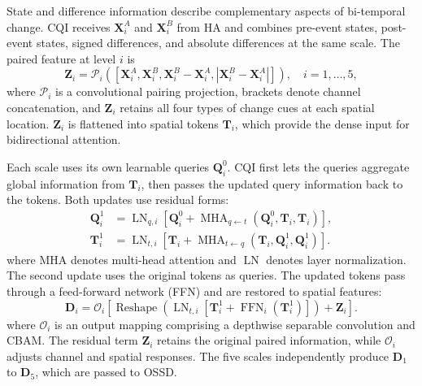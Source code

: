 \documentclass[authoryear,preprint,12pt]{elsarticle}
\begin{document}
State and difference information describe complementary aspects of bi-temporal change. CQI receives \(\mathbf X_i^A\) and \(\mathbf X_i^B\) from HA and combines pre-event states, post-event states, signed differences, and absolute differences at the same scale. The paired feature at level \(i\) is
\begin{equation}\label{eq:cqi_pair}
  \mathbf{Z}_{i}
  =
  \mathcal{P}_{i}\!\left(
  \left[
  \mathbf{X}_{i}^{A},
  \mathbf{X}_{i}^{B},
  \mathbf{X}_{i}^{B}-\mathbf{X}_{i}^{A},
  \left|\mathbf{X}_{i}^{B}-\mathbf{X}_{i}^{A}\right|
  \right]\right),
  \quad i=1,\ldots,5,
\end{equation}
where \(\mathcal P_i\) is a convolutional pairing projection, brackets denote channel concatenation, and \(\mathbf Z_i\) retains all four types of change cues at each spatial location. \(\mathbf Z_i\) is flattened into spatial tokens \(\mathbf T_i\), which provide the dense input for bidirectional attention.

Each scale uses its own learnable queries \(\mathbf Q_i^0\). CQI first lets the queries aggregate global information from \(\mathbf T_i\), then passes the updated query information back to the tokens. Both updates use residual forms:
\begin{align}
 \mathbf{Q}_{i}^{1}
 &=\operatorname{LN}_{q,i}\!\left[\mathbf{Q}_{i}^{0}
 +\operatorname{MHA}_{q\leftarrow t}(\mathbf{Q}_{i}^{0},\mathbf{T}_{i},\mathbf{T}_{i})\right],\label{eq:cqi_query}\\
 \mathbf{T}_{i}^{1}
 &=\operatorname{LN}_{t,i}\!\left[\mathbf{T}_{i}
 +\operatorname{MHA}_{t\leftarrow q}(\mathbf{T}_{i},\mathbf{Q}_{i}^{1},\mathbf{Q}_{i}^{1})\right].\label{eq:cqi_token}
\end{align}
where MHA denotes multi-head attention and \(\operatorname{LN}\) denotes layer normalization. The second update uses the original tokens as queries. The updated tokens pass through a feed-forward network (FFN) and are restored to spatial features:
\begin{equation}\label{eq:cqi_output}
 \mathbf{D}_i=\mathcal{O}_i\!\left[
 \operatorname{Reshape}\!\left(\operatorname{LN}_{t,i}\left[\mathbf{T}_{i}^{1}+\operatorname{FFN}_i(\mathbf{T}_{i}^{1})\right]\right)+\mathbf{Z}_i\right].
\end{equation}
where \(\mathcal O_i\) is an output mapping comprising a depthwise separable convolution and CBAM. The residual term \(\mathbf Z_i\) retains the original paired information, while \(\mathcal O_i\) adjusts channel and spatial responses. The five scales independently produce \(\mathbf D_1\) to \(\mathbf D_5\), which are passed to OSSD.
\end{document}
